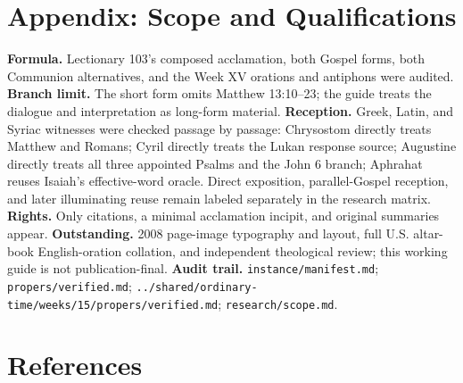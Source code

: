 \section*{Appendix: Scope and Qualifications}

\begin{studyframe}
\textbf{Formula.} Lectionary 103's composed acclamation, both Gospel forms, both Communion alternatives, and the Week XV orations and antiphons were audited. \textbf{Branch limit.} The short form omits Matthew 13:10--23; the guide treats the dialogue and interpretation as long-form material. \textbf{Reception.} Greek, Latin, and Syriac witnesses were checked passage by passage: Chrysostom directly treats Matthew and Romans; Cyril directly treats the Lukan response source; Augustine directly treats all three appointed Psalms and the John 6 branch; Aphrahat reuses Isaiah's effective-word oracle. Direct exposition, parallel-Gospel reception, and later illuminating reuse remain labeled separately in the research matrix. \textbf{Rights.} Only citations, a minimal acclamation incipit, and original summaries appear. \textbf{Outstanding.} 2008 page-image typography and layout, full U.S. altar-book English-oration collation, and independent theological review; this working guide is not publication-final. \textbf{Audit trail.} \nolinkurl{instance/manifest.md}; \nolinkurl{propers/verified.md}; \nolinkurl{../shared/ordinary-time/weeks/15/propers/verified.md}; \nolinkurl{research/scope.md}.
\end{studyframe}

\section*{References}

